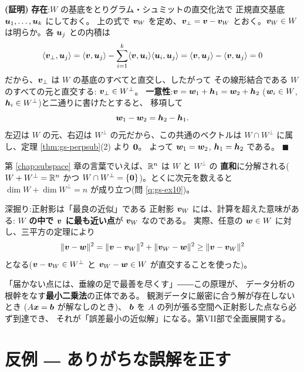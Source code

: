 \noindent\textbf{(証明)}\quad
\textbf{存在}:$W$ の基底をとりグラム・シュミットの直交化法で
正規直交基底 $\bm{u}_1, \dots, \bm{u}_k$ にしておく。
上の式で $\bm{v}_W$ を定め、$\bm{v}_{\perp} = \bm{v} - \bm{v}_W$
とおく。$\bm{v}_W \in W$ は明らか。各 $\bm{u}_j$ との内積は
\[
\langle \bm{v}_{\perp}, \bm{u}_j \rangle
= \langle \bm{v}, \bm{u}_j \rangle
- \sum_{i=1}^{k} \langle \bm{v}, \bm{u}_i \rangle
\langle \bm{u}_i, \bm{u}_j \rangle
= \langle \bm{v}, \bm{u}_j \rangle - \langle \bm{v}, \bm{u}_j \rangle = 0
\]
だから、$\bm{v}_{\perp}$ は $W$ の基底のすべてと直交し、したがって
その線形結合である $W$ のすべての元と直交する:
$\bm{v}_{\perp} \in W^{\perp}$。
\textbf{一意性}:$\bm{v} = \bm{w}_1 + \bm{h}_1 = \bm{w}_2 + \bm{h}_2$
($\bm{w}_i \in W$, $\bm{h}_i \in W^{\perp}$)と二通りに書けたとすると、
移項して
\[
\bm{w}_1 - \bm{w}_2 = \bm{h}_2 - \bm{h}_1.
\]
左辺は $W$ の元、右辺は $W^{\perp}$ の元だから、この共通のベクトルは
$W \cap W^{\perp}$ に属し、定理 \ref{thm:gs-perpsub}(2) より $\bm{0}$。
よって $\bm{w}_1 = \bm{w}_2$, $\bm{h}_1 = \bm{h}_2$ である。
$\blacksquare$

第 \ref{chap:subspace} 章の言葉でいえば、$\mathbb{R}^n$ は $W$ と $W^{\perp}$ の
\textbf{直和}に分解される($W + W^{\perp} = \mathbb{R}^n$ かつ
$W \cap W^{\perp} = \{\bm{0}\}$)。とくに次元を数えると
$\dim W + \dim W^{\perp} = n$ が成り立つ(問 \ref{q:gs-ex10})。

\begin{itembox}[l]{深掘り:正射影は「最良の近似」である}
正射影 $\bm{v}_W$ には、計算を超えた意味がある:
\textbf{$W$ の中で $\bm{v}$ に最も近い点}が $\bm{v}_W$ なのである。
実際、任意の $\bm{w} \in W$ に対し、三平方の定理により
\[
\|\bm{v} - \bm{w}\|^2 = \|\bm{v} - \bm{v}_W\|^2 + \|\bm{v}_W - \bm{w}\|^2
\ge \|\bm{v} - \bm{v}_W\|^2
\]
となる($\bm{v} - \bm{v}_W \in W^{\perp}$ と
$\bm{v}_W - \bm{w} \in W$ が直交することを使った)。

「届かない点には、垂線の足で最善を尽くす」――この原理が、
データ分析の根幹をなす\textbf{最小二乗法}の正体である。
観測データに厳密に合う解が存在しないとき
($A\bm{x} = \bm{b}$ が解なしのとき)、
$\bm{b}$ を $A$ の列が張る空間へ正射影した点なら必ず到達でき、
それが「誤差最小の近似解」になる。第VII部で全面展開する。
\end{itembox}

\section{反例 ― ありがちな誤解を正す}

